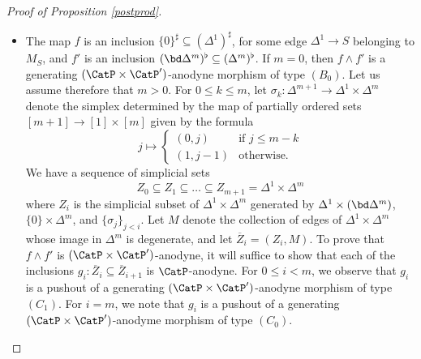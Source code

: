 \begin{proof}[Proof of Proposition \ref{postprod}]
\begin{itemize}
\item[$(B'_0)$] The map $f$ is an inclusion $\{0\}^{\sharp} \subseteq (\Delta^1)^{\sharp}$, for some
edge $\Delta^1 \rightarrow S$ belonging to $M_S$, and $f'$ is an inclusion
$(\bd \Delta^m)^{\flat} \subseteq (\Delta^m)^{\flat}$. If $m=0$, then $f \wedge f'$ is a 
generating $(\CatP \times \CatP')$-anodyne morphism of type $(B_0)$. Let us assume therefore
that $m > 0$. For $0 \leq k \leq m$, let $\sigma_k: \Delta^{m+1} \rightarrow \Delta^1 \times \Delta^m$
denote the simplex determined by the map of partially ordered sets $[m+1] \rightarrow [1] \times [m]$ given by the formula
$$ j \mapsto \begin{cases} (0,j) & \text{if } j \leq m-k \\
(1, j-1) & \text{otherwise.} \end{cases}$$
We have a sequence of simplicial sets
$$ Z_0 \subseteq Z_1 \subseteq \ldots \subseteq Z_{m+1} = \Delta^1 \times \Delta^m$$
where $Z_i$ is the simplicial subset of $\Delta^1 \times \Delta^m$ generated by
$\Delta^1 \times (\bd \Delta^m)$, $\{0\} \times \Delta^m$, and $\{ \sigma_j \}_{j < i}$.
Let $M$ denote the collection of edges of $\Delta^1 \times \Delta^m$ whose image in
$\Delta^m$ is degenerate, and let $\overline{Z}_i = (Z_i, M)$. To prove that
$f \wedge f'$ is $(\CatP \times \CatP')$-anodyne, it will suffice to show that each of the inclusions
$g_i: \overline{Z}_i \subseteq \overline{Z}_{i+1}$ is $\CatP$-anodyne. For $0 \leq i < m$, we observe that $g_i$ is a pushout of a generating $(\CatP \times \CatP')$-anodyne morphism of type
$(C_1)$. For $i = m$, we note that $g_i$ is a pushout of a generating $(\CatP \times \CatP')$-anodyme morphism of type $(C_0)$.


\end{itemize}
\end{proof}
